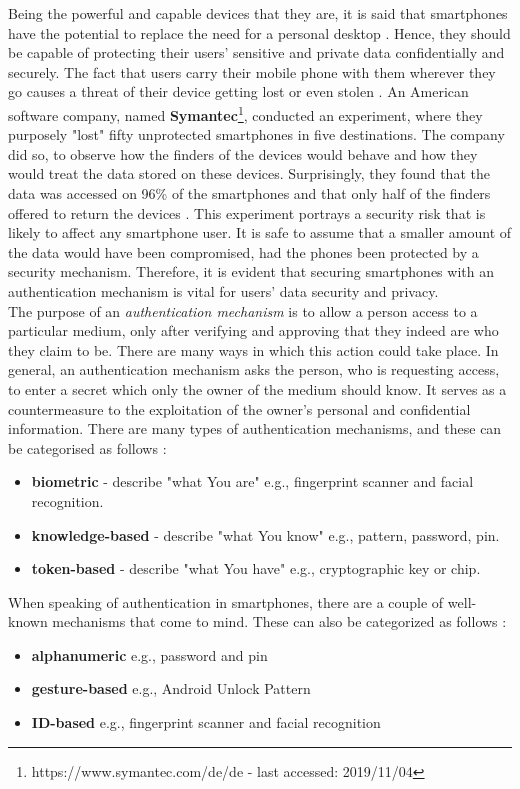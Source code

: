 Being the powerful and capable devices that they are, it is said that smartphones have the potential to replace the need for a personal desktop \cite{Alsaleh}. Hence, they should be capable of protecting their users' sensitive and private data confidentially and securely. The fact that users carry their mobile phone with them wherever they go causes a threat of their device getting lost or even stolen \cite{Egelman:2014:YRL:2660267.2660273}. An American software company, named \textbf{Symantec}\footnote{https://www.symantec.com/de/de - last accessed: 2019/11/04}, conducted an experiment, where they purposely "lost" fifty unprotected smartphones in five destinations. The company did so, to observe how the finders of the devices would behave and how they would treat the data stored on these devices. Surprisingly, they found that the data was accessed on 96\% of the smartphones and that only half of the finders offered to return the devices \cite{symantec}.  This experiment portrays a security risk that is likely to affect any smartphone user.  It is safe to assume that a smaller amount of the data would have been compromised, had the phones been protected by a security mechanism. Therefore, it is evident that securing smartphones with an authentication mechanism is vital for users' data security and privacy.\\

The purpose of an \textit{authentication mechanism} is to allow a person access to a particular medium, only after verifying and approving that they indeed are who they claim to be. There are many ways in which this action could take place. In general, an authentication mechanism asks the person, who is requesting access, to enter a secret which only the owner of the medium should know. It serves as a countermeasure to the exploitation of the owner's personal and confidential information. There are many types of authentication mechanisms, and these can be categorised as follows \cite{gorman}: 
\begin{itemize}
    \item \textbf{biometric} - describe "what You are" e.g., fingerprint scanner and facial recognition.
    \item \textbf{knowledge-based} - describe "what You know" e.g., pattern, password, pin.
    \item \textbf{token-based} - describe "what You have" e.g., cryptographic key or chip.
\end{itemize}


When speaking of authentication in smartphones, there are a couple of well-known mechanisms that come to mind. These can also be categorized as follows \cite{ediss20251,gorman} : 
\begin{itemize}
    \item \textbf{alphanumeric} e.g., password and pin
    \item \textbf{gesture-based} e.g., Android Unlock Pattern
    \item \textbf{ID-based} e.g., fingerprint scanner and facial recognition 
\end{itemize}

